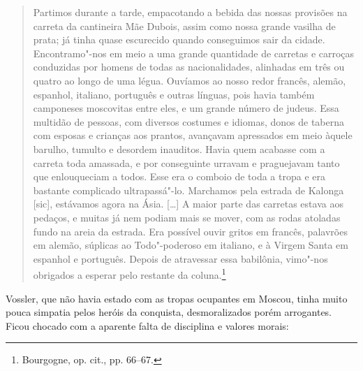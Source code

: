 \begin{quote}
Partimos durante a tarde, empacotando a bebida das nossas provisões na
carreta da cantineira Mãe Dubois, assim como nossa grande vasilha
de prata; já tinha quase escurecido quando conseguimos sair da cidade.
Encontramo"-nos em meio a uma grande quantidade de carretas e carroças
conduzidas por homens de todas as nacionalidades, alinhadas em três ou
quatro ao longo de uma légua. Ouvíamos ao nosso redor francês, alemão,
espanhol, italiano, português e outras línguas, pois havia também
camponeses moscovitas entre eles, e um grande número de judeus. Essa
multidão de pessoas, com diversos costumes e idiomas, donos de taberna
com esposas e crianças aos prantos, avançavam apressados em meio àquele
barulho, tumulto e desordem inauditos. Havia quem acabasse com a carreta
toda amassada, e por conseguinte urravam e praguejavam tanto que
enlouqueciam a todos. Esse era o comboio de toda a tropa e era bastante
complicado ultrapassá"-lo. Marchamos pela estrada de Kalonga {[}sic{]}, 
estávamos agora na Ásia. [\ldots{}] A maior parte das carretas estava
aos pedaços, e muitas já nem podiam mais se mover, com as rodas atoladas
fundo na areia da estrada. Era possível ouvir gritos em francês,
palavrões em alemão, súplicas ao Todo"-poderoso em italiano, e à Virgem
Santa em espanhol e português. Depois de atravessar essa babilônia,
vimo"-nos obrigados a esperar pelo restante da coluna.\footnote{Bourgogne, op. cit., pp. 66--67.} 
\end{quote}

Vossler, que não havia estado com as tropas ocupantes em Moscou, tinha
muito pouca simpatia pelos heróis da conquista, desmoralizados porém
arrogantes. Ficou chocado com a aparente falta de disciplina e valores
morais:

